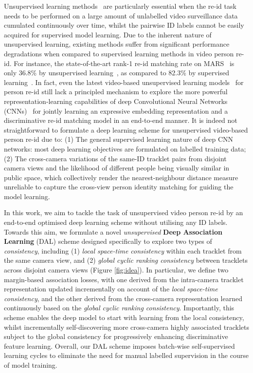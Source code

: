 \documentclass{bmvc2k}
\begin{document}
Unsupervised learning methods~\cite{ma2017person,liu2017stepwise,ye2017dynamic,liu2015spatio,karanam2015person,wang2018reid} 
are particularly essential 
when the re-id task needs to be performed on a large amount of unlabelled
video surveillance data cumulated continuously over time, whilst the pairwise ID labels cannot be easily acquired for supervised model learning. 
Due to the inherent nature of unsupervised learning, existing methods
suffer from significant performance degradations when compared to 
supervised learning methods in video person re-id. 
For instance, the state-of-the-art rank-1 re-id matching rate on MARS~\cite{zheng2016mars} is only 
36.8\% by unsupervised learning~\cite{ye2017dynamic}, 
as compared to 82.3\% by supervised learning~\cite{li2018diversity}. 
In fact, even the latest video-based unsupervised learning models~\cite{liu2017stepwise,ye2017dynamic} for person re-id 
still lack a principled mechanism
to explore the more powerful representation-learning capabilities of 
deep Convolutional Neural Networks (CNNs)~\cite{bengio2013representation} for jointly learning 
an expressive embedding representation and a discriminative re-id matching model in an end-to-end manner. 
It is indeed not straightforward to formulate a deep learning scheme 
for unsupervised video-based person re-id due to:
(1) The general supervised learning nature of deep CNN networks: 
most deep learning objectives are formulated on labelled training data;
(2) The cross-camera variations of the same-ID tracklet pairs from disjoint camera views
and the likelihood of different people being visually similar in public space, 
which collectively render the nearest-neighbour distance measure unreliable 
to capture the cross-view person identity matching for guiding the model learning. 


In this work, we aim to tackle the task of unsupervised video person re-id by an end-to-end optimised deep learning scheme without utilising any ID labels. 
Towards this aim, we formulate a novel {\em unsupervised} \textbf{Deep
  Association Learning} (DAL) scheme designed specifically to explore
  two types of {\em consistency}, including 
(1) {\em local space-time consistency} within each tracklet from the same camera view, 
and (2) {\em global cyclic ranking consistency} between tracklets across disjoint camera views
(Figure \ref{fig:idea}).
In particular, we define two margin-based association losses, with one derived from the intra-camera tracklet representation updated incrementally
on account of the {\em local space-time consistency},
and the other derived from the cross-camera representation
learned continuously based on the {\em global cyclic ranking consistency}. 
Importantly, this scheme enables the deep model to start with learning from the local consistency,
whilst incrementally self-discovering more cross-camera highly associated tracklets 
subject to the global consistency for progressively enhancing discriminative feature learning. Overall, our DAL scheme imposes batch-wise self-supervised learning cycles 
to eliminate the need for manual labelled supervision in the course of model training. 
\end{document}
